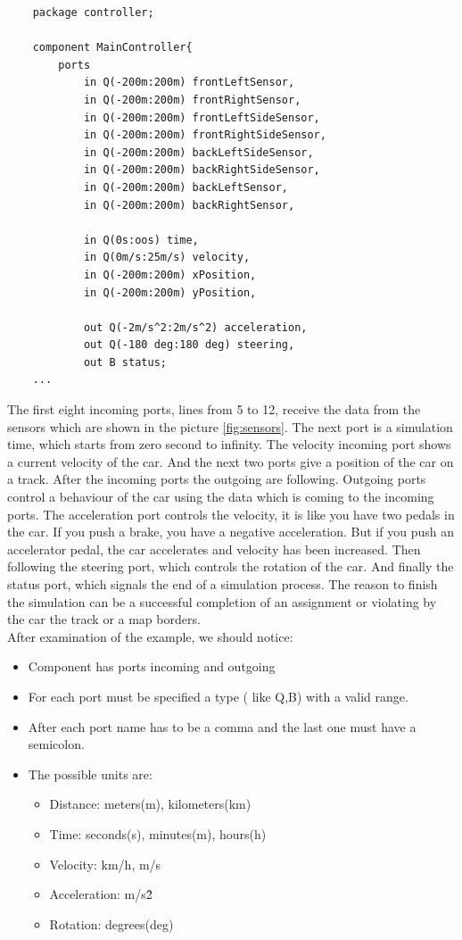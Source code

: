 \bigskip
\begin{lstlisting}
    package controller;

    component MainController{
        ports                                   
            in Q(-200m:200m) frontLeftSensor,
            in Q(-200m:200m) frontRightSensor,
            in Q(-200m:200m) frontLeftSideSensor,
            in Q(-200m:200m) frontRightSideSensor,
            in Q(-200m:200m) backLeftSideSensor,
            in Q(-200m:200m) backRightSideSensor,
            in Q(-200m:200m) backLeftSensor,
            in Q(-200m:200m) backRightSensor,
    
            in Q(0s:oos) time,
            in Q(0m/s:25m/s) velocity,
            in Q(-200m:200m) xPosition,
            in Q(-200m:200m) yPosition,
    
            out Q(-2m/s^2:2m/s^2) acceleration,
            out Q(-180 deg:180 deg) steering,
            out B status;
    ...
\end{lstlisting}
\bigskip
The first eight incoming ports, lines from 5 to 12, receive the data from the sensors which are shown in the picture \ref{fig:sensors}. The next port is a simulation time, which starts from zero second to infinity. The velocity incoming port shows a current velocity of the car. And the next two ports give a position of the car on a track. After the incoming ports the outgoing are following. Outgoing ports control a behaviour of the car using the data which is coming to the incoming ports. The acceleration port controls the velocity, it is like you have two pedals in the car. If you push a brake, you have a negative acceleration. But if you push an accelerator pedal, the car accelerates and velocity has been increased. Then following the steering port, which controls the rotation of the car. And finally the status port, which signals the end of a simulation process. The reason to finish the simulation can be a successful completion of an assignment or violating by the car the track or a map borders. \\
After examination of the example, we should notice:
\begin{itemize}
\item Component has ports incoming and outgoing
\item For each port must be specified a type ( like Q,B) with a valid range.
\item After each port name has to be a comma and the last one must have a semicolon.
\item The possible units are:
    \begin{itemize}
        \item Distance: meters(m), kilometers(km)
        \item Time: seconds(s), minutes(m), hours(h)
        \item Velocity: km/h, m/s
        \item Acceleration: m/s\^2
        \item Rotation: degrees(deg)
    \end{itemize}
\end{itemize}
